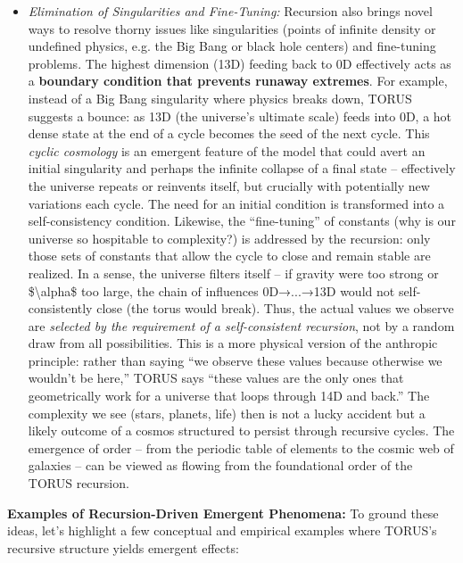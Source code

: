 \documentclass[
]{article}
\begin{document}
{\begin{itemize}
  actually structured outcomes of one recursion principle.
\item
  \emph{Elimination of Singularities and Fine-Tuning:} Recursion also
  brings novel ways to resolve thorny issues like singularities (points
  of infinite density or undefined physics, e.g. the Big Bang or black
  hole centers) and fine-tuning problems. The highest dimension (13D)
  feeding back to 0D effectively acts as a \textbf{boundary condition
  that prevents runaway extremes}. For example, instead of a Big Bang
  singularity where physics breaks down, TORUS suggests a bounce: as 13D
  (the universe's ultimate scale) feeds into 0D, a hot dense state at
  the end of a cycle becomes the seed of the next cycle\hspace{0pt}.
  This \emph{cyclic cosmology} is an emergent feature of the model that
  could avert an initial singularity and perhaps the infinite collapse
  of a final state -- effectively the universe repeats or reinvents
  itself, but crucially with potentially new variations each cycle. The
  need for an initial condition is transformed into a self-consistency
  condition. Likewise, the ``fine-tuning'' of constants (why is our
  universe so hospitable to complexity?) is addressed by the recursion:
  only those sets of constants that allow the cycle to close and remain
  stable are realized\hspace{0pt}. In a sense, the universe filters
  itself -- if gravity were too strong or \$\textbackslash alpha\$ too
  large, the chain of influences 0D→...→13D would not self-consistently
  close (the torus would break). Thus, the actual values we observe are
  \emph{selected by the requirement of a self-consistent recursion}, not
  by a random draw from all possibilities\hspace{0pt}. This is a more
  physical version of the anthropic principle: rather than saying ``we
  observe these values because otherwise we wouldn't be here,'' TORUS
  says ``these values are the only ones that geometrically work for a
  universe that loops through 14D and back.'' The complexity we see
  (stars, planets, life) then is not a lucky accident but a likely
  outcome of a cosmos structured to persist through recursive cycles.
  The emergence of order -- from the periodic table of elements to the
  cosmic web of galaxies -- can be viewed as flowing from the
  foundational order of the TORUS recursion.
\end{itemize}

\textbf{Examples of Recursion-Driven Emergent Phenomena:} To ground
these ideas, let's highlight a few conceptual and empirical examples
where TORUS's recursive structure yields emergent effects:

}
\end{document}
